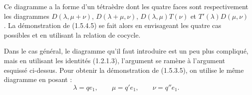 Ce diagramme a la forme d'un tétraèdre dont les quatre faces sont
respectivement les diagrammes $D(\lambda,\mu+\nu)$,
$D(\lambda+\mu,\nu)$, $D(\lambda,\mu)T(\nu)$ et
$T'(\lambda)D(\mu,\nu)$. La démonstration de (1.5.4.5) se fait alors
en envisageant les quatre cas possibles et en utilisant la relation de
cocycle.

Dans le cas général, le diagramme qu'il faut introduire est un peu
plus compliqué, mais en utilisant les identités (1.2.1.3), l'argument
se ramène à l'argument esquissé ci-dessus. Pour obtenir la démonstration
de (1.5.3.5), on utilise le même diagramme en posant :
\[
  \lambda=qe_1,\qquad \mu=q'e_1,\qquad \nu=q''e_1.
\]
